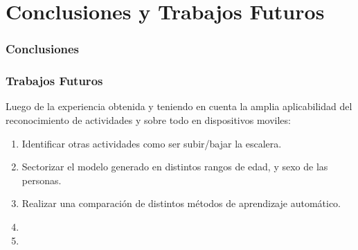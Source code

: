 \chapter{Conclusiones y Trabajos Futuros}

\subsection{Conclusiones}


\subsection{Trabajos Futuros}
Luego de la experiencia obtenida y teniendo en cuenta la amplia aplicabilidad del reconocimiento de actividades y sobre todo en dispositivos moviles:
\begin{enumerate}
\item Identificar otras actividades como ser subir/bajar la escalera.
\item Sectorizar el modelo generado en distintos rangos de edad, y sexo de las personas.
\item Realizar una comparación de distintos métodos de aprendizaje automático. 
\item 
\item 
\end{enumerate}